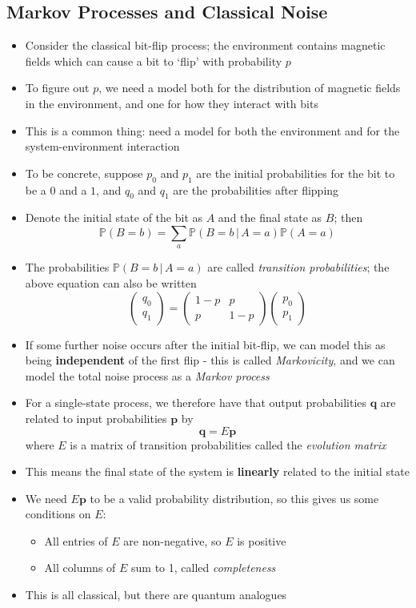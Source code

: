\documentclass[12pt,a4paper]{article}
\numberwithin{equation}{section}
\begin{document}
	\subsection{Markov Processes and Classical Noise}
	\begin{itemize}
		\item Consider the classical bit-flip process; the environment contains magnetic fields which can cause a bit to `flip' with probability $p$
		\item To figure out $p$, we need a model both for the distribution of magnetic fields in the environment, and one for how they interact with bits
		\item This is a common thing: need a model for both the environment and for the system-environment interaction
		\item To be concrete, suppose $p_{0}$ and $p_{1}$ are the initial probabilities for the bit to be a $0$ and a $1$, and $q_{0}$ and $q_{1}$ are the probabilities after flipping
		\item Denote the initial state of the bit as $A$ and the final state as $B$; then
		$$
			\mathbb{P}(B=b)=\sum_{a}\mathbb{P}(B=b\,|\,A=a)\mathbb{P}(A=a)
		$$
		\item The probabilities $\mathbb{P}(B=b\,|\,A=a)$ are called \textit{transition probabilities}; the above equation can also be written
		$$
			\begin{pmatrix}q_{0}\\q_{1}\end{pmatrix}=\begin{pmatrix}1-p&p\\p&1-p\end{pmatrix}\begin{pmatrix}p_{0}\\p_{1}\end{pmatrix}
		$$
		\item If some further noise occurs after the initial bit-flip, we can model this as being \textbf{independent} of the first flip - this is called \textit{Markovicity}, and we can model the total noise process as a \textit{Markov process}
		\item For a single-state process, we therefore have that output probabilities $\mathbf{q}$ are related to input probabilities $\mathbf{p}$ by
		\begin{equation}
			\mathbf{q}=E\mathbf{p}
		\end{equation}
		where $E$ is a matrix of transition probabilities called the \textit{evolution matrix}
		\item This means the final state of the system is \textbf{linearly} related to the initial state
		\item We need $E\mathbf{p}$ to be a valid probability distribution, so this gives us some conditions on $E$:
		\begin{itemize}
			\item All entries of $E$ are non-negative, so $E$ is positive
			\item All columns of $E$ sum to 1, called \textit{completeness}
		\end{itemize}
		\item This is all classical, but there are quantum analogues
	\end{itemize}
\end{document}
